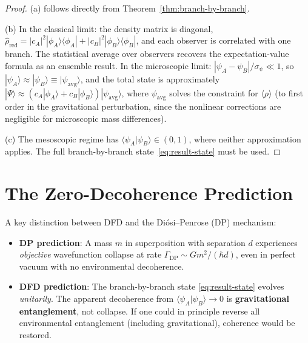 \documentclass[11pt,a4paper]{article}
\begin{document}
\begin{proof}
(a) follows directly from Theorem~\ref{thm:branch-by-branch}.

(b) In the classical limit: the density matrix is diagonal,
$\hat\rho_\mathrm{red} = |c_A|^2|\phi_A\rangle\langle\phi_A|
+ |c_B|^2|\phi_B\rangle\langle\phi_B|$, and each observer is correlated
with one branch. The statistical average over observers recovers the
expectation-value formula as an ensemble result. In the microscopic
limit: $|\psi_A - \psi_B|/\sigma_\psi \ll 1$, so
$|\psi_A\rangle \approx |\psi_B\rangle \equiv |\psi_\mathrm{avg}\rangle$,
and the total state is approximately
$|\Psi\rangle \approx (c_A|\phi_A\rangle + c_B|\phi_B\rangle)
|\psi_\mathrm{avg}\rangle$, where $\psi_\mathrm{avg}$ solves the
constraint for $\langle\rho\rangle$ (to first order in the gravitational
perturbation, since the nonlinear corrections are negligible for
microscopic mass differences).

(c) The mesoscopic regime has $\langle\psi_A|\psi_B\rangle \in (0,1)$,
where neither approximation applies. The full branch-by-branch
state~\eqref{eq:result-state} must be used.
\end{proof}

\section{The Zero-Decoherence Prediction}
\label{sec:zero-decoherence}

A key distinction between DFD and the Di\'osi--Penrose (DP) mechanism:

\begin{itemize}
\item \textbf{DP prediction}: A mass $m$ in superposition with separation
$d$ experiences \emph{objective} wavefunction collapse at rate
$\Gamma_\mathrm{DP} \sim Gm^2/(\hbar d)$, even in perfect vacuum with
no environmental decoherence.

\item \textbf{DFD prediction}: The branch-by-branch state
\eqref{eq:result-state} evolves \emph{unitarily}. The apparent
decoherence from $\langle\psi_A|\psi_B\rangle \to 0$ is
\textbf{gravitational entanglement}, not collapse. If one could in
principle reverse all environmental entanglement (including
gravitational), coherence would be restored.
\end{itemize}
\end{document}
